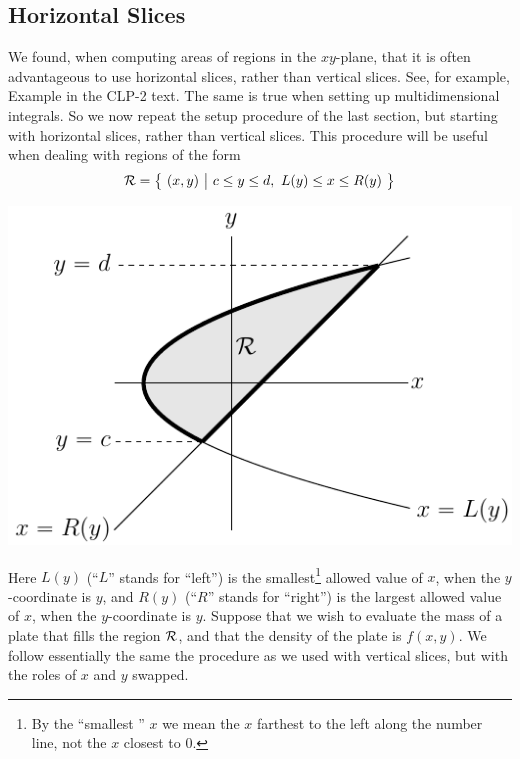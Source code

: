 \subsection{Horizontal Slices}
We found, when computing areas of regions in the $xy$-plane, that
it is often advantageous to use horizontal slices, rather than vertical
slices. See, for example,
Example  in the CLP-2 text.
The same is true when setting up multidimensional integrals. So we now repeat
the setup procedure of the last section, but starting with horizontal slices, 
rather than vertical slices. This procedure will be useful when 
dealing with regions of the form
\begin{equation*}
\cR = \big\{\ (x,y)\ \big|\ c\le y\le d,\ L(y)\le x\le R(y)\ \big\}
\end{equation*}
\begin{efig}
\begin{center}
   \includegraphics{hSliceA.pdf}
\end{center}
\end{efig}
Here $L(y)$ (``$L$'' stands for ``left'') is the smallest\footnote{
By the ``smallest '' $x$ we mean the $x$ farthest to the left along 
the number line, not the $x$ closest to $0$.} allowed 
value of $x$, when the $y$-coordinate is $y$, and 
$R(y)$ (``$R$'' stands for ``right'') is the largest allowed value 
of $x$, when the $y$-coordinate is $y$.
Suppose that we wish to evaluate the mass of a plate that
fills the region $\mathcal{R}$, and that the density of the plate is $f(x,y)$. 
We follow essentially the same the procedure as we used 
with vertical slices, but with the roles of $x$ and $y$ swapped.
